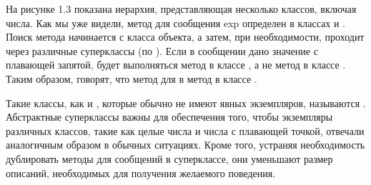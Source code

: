 На рисунке 1.3 показана иерархия, представляющая несколько классов, включая числа. 
Как мы уже видели, метод для сообщения exp определен в классах  и . 
Поиск метода начинается с класса объекта, а затем, при необходимости, проходит 
через различные суперклассы (по ). Если в сообщении  
дано значение с плавающей запятой, будет выполняться метод в классе , 
а не метод в классе . Таким образом, говорят, что метод для  в  
 метод в классе .


Такие классы, как  и , которые обычно не имеют явных экземпляров, 
называются . Абстрактные суперклассы важны для 
обеспечения того, чтобы экземпляры различных классов, такие как целые числа 
и числа с плавающей точкой, отвечали аналогичным образом в обычных ситуациях. 
Кроме того, устраняя необходимость дублировать методы для сообщений в 
суперклассе, они уменьшают размер описаний, необходимых для получения 
желаемого поведения.
